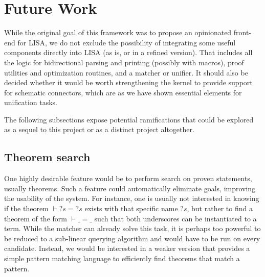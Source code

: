 \section{Future Work}
\label{sec:future-work}

While the original goal of this framework was to propose an opinionated front-end for LISA, we do not exclude the possibility of integrating some useful components directly into LISA (as is, or in a refined version). That includes all the logic for bidirectional parsing and printing (possibly with macros), proof utilities and optimization routines, and a matcher or unifier. It should also be decided whether it would be worth strengthening the kernel to provide support for schematic connectors, which are as we have shown essential elements for unification tasks.

The following subsections expose potential ramifications that could be explored as a sequel to this project or as a distinct project altogether.

% 

\subsection{Theorem search}

One highly desirable feature would be to perform search on proven statements, usually theorems. Such a feature could automatically eliminate goals, improving the usability of the system. For instance, one is usually not interested in knowing if the theorem $\vdash {?s} = {?s}$ exists with that specific name ${?s}$, but rather to find a theorem of the form $\vdash \_ = \_$ such that both underscores can be instantiated to a term. While the matcher can already solve this task, it is perhaps too powerful to be reduced to a sub-linear querying algorithm and would have to be run on every candidate. Instead, we would be interested in a weaker version that provides a simple pattern matching language to efficiently find theorems that match a pattern.

